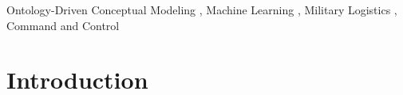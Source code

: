 \documentclass[
]{ceurart}
\begin{document}
\begin{keywords}
  Ontology-Driven Conceptual Modeling \sep
  Machine Learning \sep
  Military Logistics \sep
  Command and Control
\end{keywords}

\maketitle

\section{Introduction}
\end{document}
